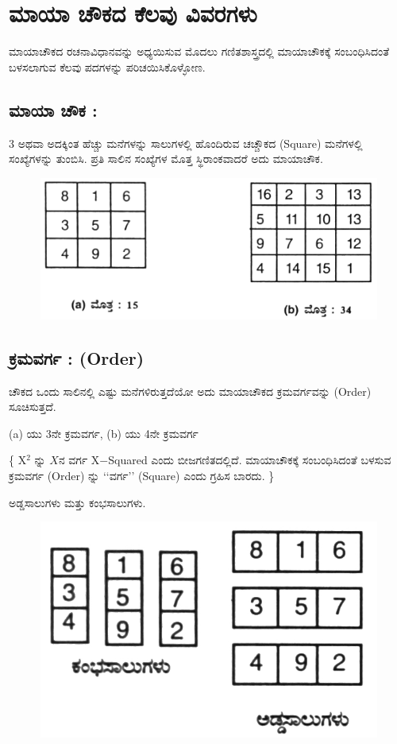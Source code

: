 \chapter{ಮಾಯಾ ಚೌಕದ ಕೆಲವು ವಿವರಗಳು}

ಮಾಯಾಚೌಕದ ರಚನಾವಿಧಾನವನ್ನು ಅಧ್ಯಯಿಸುವ ಮೊದಲು ಗಣಿತಶಾಸ್ತ್ರದಲ್ಲಿ ಮಾಯಾಚೌಕಕ್ಕೆ ಸಂಬಂಧಿಸಿದಂತೆ ಬಳಸಲಾಗುವ ಕೆಲವು ಪದಗಳನ್ನು ಪರಿಚಯಿಸಿಕೊಳ್ಳೋಣ.

\section*{ಮಾಯಾ ಚೌಕ :}

3 ಅಥವಾ ಅದಕ್ಕಿಂತ ಹೆಚ್ಚು ಮನೆಗಳನ್ನು ಸಾಲುಗಳಲ್ಲಿ ಹೊಂದಿರುವ ಚಚ್ಚೌಕದ (Square) ಮನೆಗಳಲ್ಲಿ ಸಂಖ್ಯೆಗಳನ್ನು ತುಂಬಿಸಿ. ಪ್ರತಿ ಸಾಲಿನ ಸಂಖ್ಯೆಗಳ ಮೊತ್ತ ಸ್ಥಿರಾಂಕವಾದರೆ ಅದು ಮಾಯಾಚೌಕ.
\begin{figure}[H]
\includegraphics[scale=.8]{src/figures/chap2/fig2-1.jpg}
\end{figure}

\section*{ಕ್ರಮವರ್ಗ : (Order)}

ಚೌಕದ ಒಂದು ಸಾಲಿನಲ್ಲಿ ಎಷ್ಟು ಮನೆಗಳಿರುತ್ತದೆಯೋ ಅದು ಮಾಯಾಚೌಕದ ಕ್ರಮವರ್ಗವನ್ನು (Order) ಸೂಚಿಸುತ್ತದೆ.

(a) ಯು 3ನೇ ಕ್ರಮವರ್ಗ, (b) ಯು 4ನೇ ಕ್ರಮವರ್ಗ

\{ X$^2$ ನ್ನು $X$ನ ವರ್ಗ  X$-$Squared ಎಂದು ಬೀಜಗಣಿತದಲ್ಲಿದೆ. ಮಾಯಾಚೌಕಕ್ಕೆ \break ಸಂಬಂಧಿಸಿದಂತೆ ಬಳಸುವ ಕ್ರಮವರ್ಗ (Order) ನ್ನು ‘‘ವರ್ಗ’’ (Square) ಎಂದು ಗ್ರಹಿಸ\- ಬಾರದು. \}

ಅಡ್ಡಸಾಲುಗಳು ಮತ್ತು ಕಂಭಸಾಲುಗಳು.
\begin{figure}[H]
\includegraphics[scale=.8]{src/figures/chap2/fig2-2.jpg}
\end{figure}

